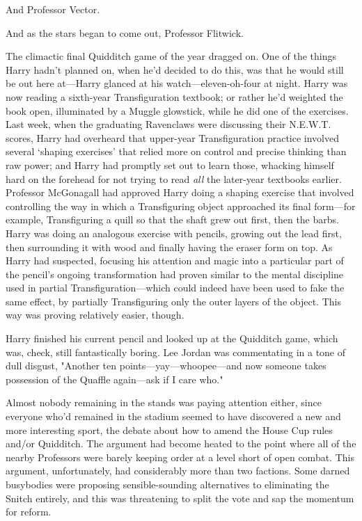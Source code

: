 And Professor Vector.

And as the stars began to come out, Professor Flitwick.

The climactic final Quidditch game of the year{\el} dragged on.
\sbreak
One of the things Harry hadn't planned on, when he'd decided to do this, was
that he would still be out here at—Harry glanced at his
watch—eleven-oh-four at night. Harry was now reading a sixth-year
Transfiguration textbook; or rather he'd weighted the book open, illuminated by
a Muggle glowstick, while he did one of the exercises. Last week, when the
graduating Ravenclaws were discussing their N.E.W.T. scores, Harry had
overheard that upper-year Transfiguration practice involved several `shaping
exercises' that relied more on control and precise thinking than raw power; and
Harry had promptly set out to learn those, whacking himself hard on the
forehead for not trying to read \emph{all} the later-year textbooks earlier.
Professor McGonagall had approved Harry doing a shaping exercise that involved
controlling the way in which a Transfiguring object approached its final
form—for example, Transfiguring a quill so that the shaft grew out first,
then the barbs. Harry was doing an analogous exercise with pencils, growing out
the lead first, then surrounding it with wood and finally having the eraser
form on top. As Harry had suspected, focusing his attention and magic into a
particular part of the pencil's ongoing transformation had proven similar to
the mental discipline used in partial Transfiguration—which could indeed have
been used to fake the same effect, by partially Transfiguring only the outer
layers of the object. This way was proving relatively easier, though.

Harry finished his current pencil and looked up at the Quidditch game, which
was, check, still fantastically boring. Lee Jordan was commentating in a tone
of dull disgust, "Another ten points—yay—whoopee—and now someone takes
possession of the Quaffle again—ask if I care who."

Almost nobody remaining in the stands was paying attention either, since
everyone who'd remained in the stadium seemed to have discovered a new and more
interesting sport, the debate about how to amend the House Cup rules and/or
Quidditch. The argument had become heated to the point where all of the nearby
Professors were barely keeping order at a level short of open combat. This
argument, unfortunately, had considerably more than two factions. Some darned
busybodies were proposing sensible-sounding alternatives to eliminating the
Snitch entirely, and this was threatening to split the vote and sap the
momentum for reform.

